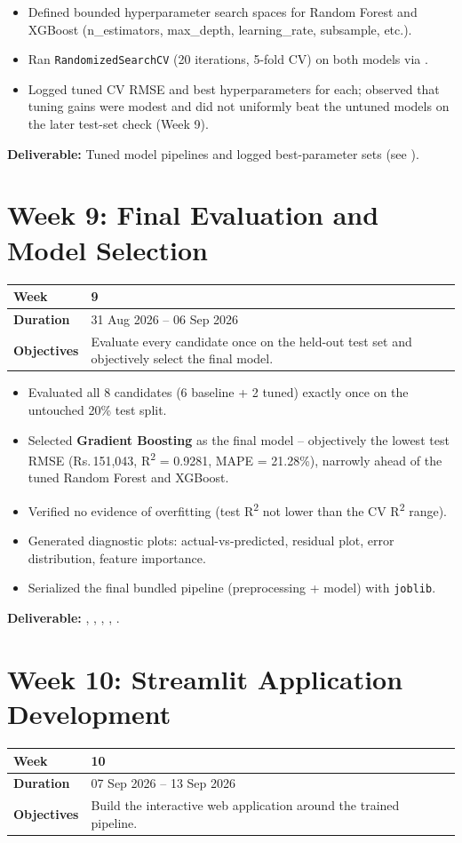 \documentclass[12pt,a4paper]{report}
\newcommand{\weektable}[3]{%
\begin{longtable}{|p{3.6cm}|p{10.5cm}|}
\hline
\textbf{Week} & \textbf{#1} \\
\hline
\textbf{Duration} & #2 \\
\hline
\textbf{Objectives} & #3 \\
\hline
\end{longtable}
}
\begin{document}
\begin{itemize}[nosep]
    \item Defined bounded hyperparameter search spaces for Random Forest and XGBoost (n\_estimators, max\_depth, learning\_rate, subsample, etc.).
    \item Ran \texttt{RandomizedSearchCV} (20 iterations, 5-fold CV) on both models via .
    \item Logged tuned CV RMSE and best hyperparameters for each; observed that tuning gains were modest and did not uniformly beat the untuned models on the later test-set check (Week 9).
\end{itemize}
\textbf{Deliverable:} Tuned model pipelines and logged best-parameter sets (see ).

\chapter{Week 9: Final Evaluation and Model Selection}
\weektable{9}{31 Aug 2026 -- 06 Sep 2026}{Evaluate every candidate once on the held-out test set and objectively select the final model.}

\begin{itemize}[nosep]
    \item Evaluated all 8 candidates (6 baseline + 2 tuned) exactly once on the untouched 20\% test split.
    \item Selected \textbf{Gradient Boosting} as the final model -- objectively the lowest test RMSE (Rs.\,151{,}043, R\textsuperscript{2} = 0.9281, MAPE = 21.28\%), narrowly ahead of the tuned Random Forest and XGBoost.
    \item Verified no evidence of overfitting (test R\textsuperscript{2} not lower than the CV R\textsuperscript{2} range).
    \item Generated diagnostic plots: actual-vs-predicted, residual plot, error distribution, feature importance.
    \item Serialized the final bundled pipeline (preprocessing + model) with \texttt{joblib}.
\end{itemize}
\textbf{Deliverable:} , , , , .

\chapter{Week 10: Streamlit Application Development}
\weektable{10}{07 Sep 2026 -- 13 Sep 2026}{Build the interactive web application around the trained pipeline.}
\end{document}
